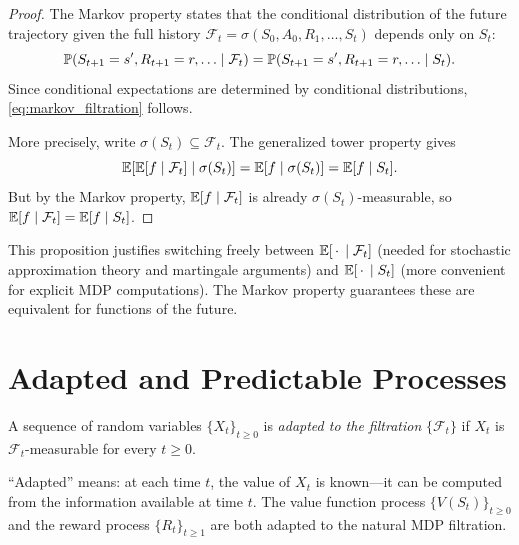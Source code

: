 \documentclass[11pt,a4paper]{article}
\begin{document}
\begin{proof}
The Markov property states that the conditional distribution of
the future trajectory given the full history
$\mathcal{F}_t = \sigma(S_0, A_0, R_1, \ldots, S_t)$ depends
only on $S_t$:
\begin{equation}
  \mathbb{P}(S_{t+1} = s', R_{t+1} = r, \ldots \mid \mathcal{F}_t)
  = \mathbb{P}(S_{t+1} = s', R_{t+1} = r, \ldots \mid S_t).
  \label{eq:markov_cond_dist}
\end{equation}
Since conditional expectations are determined by conditional
distributions, \eqref{eq:markov_filtration} follows.

More precisely, write
$\sigma(S_t) \subseteq \mathcal{F}_t$.  The generalized tower
property gives
\[
  \mathbb{E}\!\left[\mathbb{E}[f \mid \mathcal{F}_t] \;\middle|\;
    \sigma(S_t)\right]
  = \mathbb{E}[f \mid \sigma(S_t)]
  = \mathbb{E}[f \mid S_t].
\]
But by the Markov property,
$\mathbb{E}[f \mid \mathcal{F}_t]$ is already
$\sigma(S_t)$-measurable, so
$\mathbb{E}[f \mid \mathcal{F}_t] = \mathbb{E}[f \mid S_t]$.
\end{proof}

\begin{rlconnection}[title={Connection to RL}]
This proposition justifies switching freely between
$\mathbb{E}[\,\cdot\, \mid \mathcal{F}_t]$ (needed for stochastic
approximation theory and martingale arguments) and
$\mathbb{E}[\,\cdot\, \mid S_t]$ (more convenient for explicit MDP
computations).  The Markov property guarantees these are
equivalent for functions of the future.
\end{rlconnection}


\section{Adapted and Predictable Processes}
\label{sec:adapted}

\begin{definition}
\label{def:adapted}
A sequence of random variables $\{X_t\}_{t \geq 0}$ is
\emph{adapted to the filtration} $\{\mathcal{F}_t\}$ if $X_t$
is $\mathcal{F}_t$-measurable for every $t \geq 0$.
\end{definition}

\begin{remark}
``Adapted'' means: at each time $t$, the value of $X_t$ is
known---it can be computed from the information available at
time $t$.  The value function process $\{V(S_t)\}_{t \geq 0}$
and the reward process $\{R_t\}_{t \geq 1}$ are both adapted to
the natural MDP filtration.
\end{remark}
\end{document}
